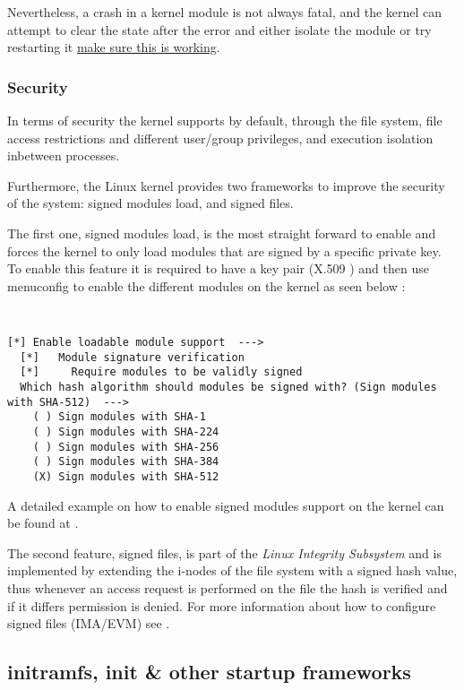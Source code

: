 Nevertheless, a crash in a kernel module is not always fatal, and the kernel can attempt to clear the state after the error and either isolate the module or try restarting it \underline{make sure this is working}.

\subsubsection{Security}

In terms of security the kernel supports by default, through the file system, file access restrictions and different user/group privileges, and execution isolation inbetween processes.

Furthermore, the Linux kernel provides two frameworks to improve the security of the system: signed modules load, and signed files.

The first one, signed modules load, is the most straight forward to enable and forces the kernel to only load modules that are signed by a specific private key. To enable this feature it is required to have a key pair (X.509 \cite{wiki:x509}) and then use menuconfig to enable the different modules on the kernel as seen below \cite{gentoo:signed_module}:

{\tt
\tiny
\begin{verbatim}
[*] Enable loadable module support  --->
  [*]   Module signature verification
  [*]     Require modules to be validly signed
  Which hash algorithm should modules be signed with? (Sign modules with SHA-512)  --->
    ( ) Sign modules with SHA-1
    ( ) Sign modules with SHA-224
    ( ) Sign modules with SHA-256
    ( ) Sign modules with SHA-384
    (X) Sign modules with SHA-512
\end{verbatim}
}

A detailed example on how to enable signed modules support on the kernel can be found at \cite{gentoo:signed_module}.


The second feature, signed files, is part of the \textit{Linux Integrity Subsystem} and is implemented by extending the i-nodes of the file system with a signed hash value, thus whenever an access request is performed on the file the hash is verified and if it differs permission is denied. For more information about how to configure signed files (IMA/EVM) see \cite{gentoo:ima,gentoo:evm,linux:ima}.


\subsection{initramfs, init \& other startup frameworks}
\label{sec:init}

